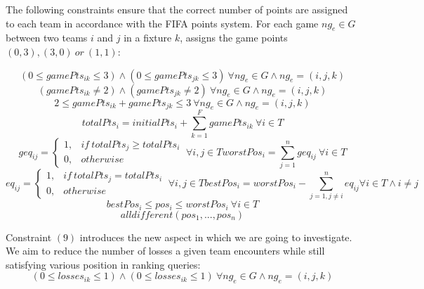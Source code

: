 \documentclass{article}
\begin{document}
	The following constraints ensure that the correct number of points are assigned to each team in accordance with the FIFA points system. For each game \(ng_e \in G \) between two teams \(i\) and \(j\) in a fixture \(k\), assigns the game points \((0,3), (3,0)\ or\ (1,1)\): 
	
	\begin{equation}
		(0 \leq gamePts_{ik} \leq 3) \wedge (0 \leq gamePts_{jk} \leq 3)\  \forall ng_e \in G \wedge ng_e = (i,j,k)
	\end{equation}
	\begin{equation}
		(gamePts_{ik} \ne 2) \wedge (gamePts_{jk} \ne 2)\ \forall ng_e \in G \wedge ng_e = (i,j,k)
	\end{equation}
	\begin{equation}
		2 \leq gamePts_{ik} + gamePts_{jk} \leq 3 \ \forall ng_e \in G \wedge ng_e = (i,j,k)
	\end{equation}
	\begin{equation}
		totalPts_i = initialPts_i + \sum_{k=1}^{F} gamePts_{ik}\  \forall i \in T
	\end{equation}
	\begin{equation}
		geq_{ij} = 
		\begin{cases}
		1, & if\ totalPts_j \geq totalPts_i\\
		0, & otherwise
		\end{cases}
		\ \forall i, j \in T
		worstPos_i = \sum_{j=1}^{n} geq_{ij} \ \forall i \in T
	\end{equation}
	\begin{equation}
		eq_{ij} = 
		\begin{cases}
			1, & if\ totalPts_j = totalPts_i\\
			0, & otherwise
		\end{cases}
		\ \forall i, j \in T
		bestPos_i = worstPos_i - \sum_{j=1, j\ne i}^{n} eq_{ij} \forall i \in T \wedge i \ne j
	\end{equation}
	\begin{equation}
		bestPos_i \leq pos_i \leq worstPos_i \ \forall i \in T
	\end{equation}
	\begin{equation}
		alldifferent(pos_1, ..., pos_n)
	\end{equation}
	
	Constraint \((9)\) introduces the new aspect in which we are going to investigate. We aim to reduce the number of losses a given team encounters while still satisfying various position in ranking queries:
	\begin{equation}
		(0 \leq losses_{ik} \leq 1) \wedge (0 \leq losses_{ik} \leq 1)\ \forall ng_e \in G \wedge ng_e = (i,j,k)
	\end{equation}
	
\end{document}
